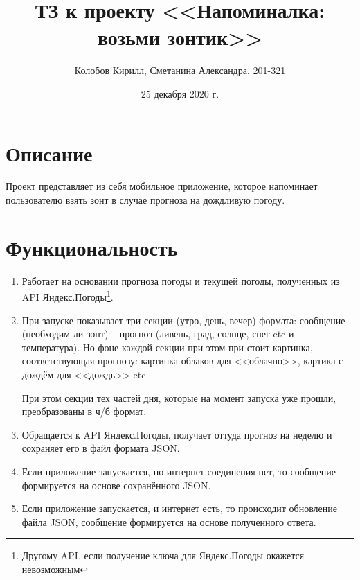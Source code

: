 \documentclass[a4paper,12pt]{report}
\author{Колобов Кирилл, Сметанина Александра, 201-321}
\title{ТЗ к проекту <<Напоминалка: возьми зонтик>>}
\date{25 декабря 2020 г.}
\begin{document}
\maketitle

\tableofcontents
\newpage

\section{Описание}
Проект представляет из себя мобильное приложение, которое напоминает пользователю 
взять зонт в случае прогноза на дождливую погоду.

\section{Функциональность}
\begin{enumerate}
\item{Работает на основании прогноза погоды и текущей погоды, полученных из API Яндекс.Погоды\footnote{
      Другому API, если получение ключа для Яндекс.Погоды окажется невозможным}.}
\item{При запуске показывает три секции (утро, день, вечер) формата: 
      сообщение (необходим ли зонт) -- прогноз (ливень, град, солнце, снег etc и температура).
      Но фоне каждой секции при этом при стоит картинка, соответствующая 
      прогнозу: картинка облаков для <<облачно>>, картика с дождём для <<дождь>> etc.

      При этом секции тех частей дня, которые на момент запуска 
      уже прошли, преобразованы в ч/б формат.}
\item{Обращается к API Яндекс.Погоды, 
      получает оттуда прогноз на неделю и сохраняет его в файл формата JSON.}
\item{Если приложение запускается, но интернет-соединения нет, 
      то сообщение формируется на основе сохранённого JSON.}
\item{Если приложение запускается, и интернет есть, то происходит 
      обновление файла JSON, сообщение формируется на основе полученного ответа.}
\end{enumerate}
\end{document}
